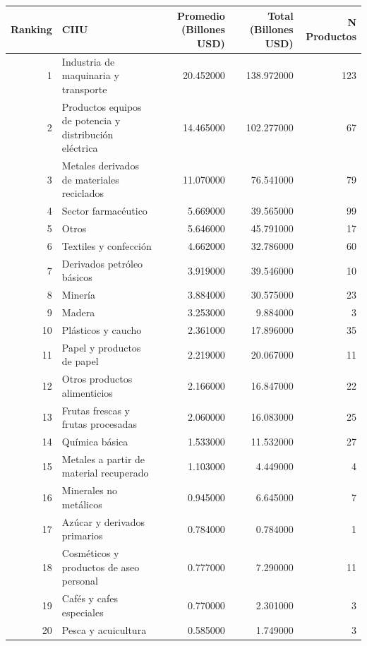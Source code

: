 \begin{tabular}{rlrrr}
\toprule
Ranking & CIIU & Promedio (Billones USD) & Total (Billones USD) & N Productos \\
\midrule
1 & Industria de maquinaria y transporte & 20.452000 & 138.972000 & 123 \\
2 & Productos equipos de potencia y distribución eléctrica & 14.465000 & 102.277000 & 67 \\
3 & Metales derivados de materiales reciclados & 11.070000 & 76.541000 & 79 \\
4 & Sector farmacéutico & 5.669000 & 39.565000 & 99 \\
5 & Otros & 5.646000 & 45.791000 & 17 \\
6 & Textiles y confección & 4.662000 & 32.786000 & 60 \\
7 & Derivados petróleo básicos & 3.919000 & 39.546000 & 10 \\
8 & Minería & 3.884000 & 30.575000 & 23 \\
9 & Madera & 3.253000 & 9.884000 & 3 \\
10 & Plásticos y caucho & 2.361000 & 17.896000 & 35 \\
11 & Papel y productos de papel & 2.219000 & 20.067000 & 11 \\
12 & Otros productos alimenticios & 2.166000 & 16.847000 & 22 \\
13 & Frutas frescas y frutas procesadas & 2.060000 & 16.083000 & 25 \\
14 & Química básica & 1.533000 & 11.532000 & 27 \\
15 & Metales a partir de material recuperado & 1.103000 & 4.449000 & 4 \\
16 & Minerales no metálicos & 0.945000 & 6.645000 & 7 \\
17 & Azúcar y derivados primarios & 0.784000 & 0.784000 & 1 \\
18 & Cosméticos y productos de aseo personal & 0.777000 & 7.290000 & 11 \\
19 & Cafés y cafes especiales & 0.770000 & 2.301000 & 3 \\
20 & Pesca y acuicultura & 0.585000 & 1.749000 & 3 \\
\bottomrule
\end{tabular}
